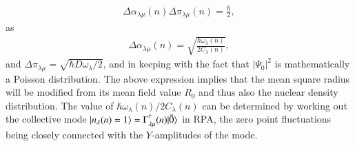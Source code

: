 \begin{align}\label{eq0.1.121}
\Delta\alpha_{\lambda\mu}{(n)}\Delta\pi_{\lambda\mu}{(n)}=\frac{\hbar}{2},
\end{align}
as
\begin{align}\label{eq1.8.2}
\Delta\alpha_{\lambda\mu}{(n)}=\sqrt{\frac{\hbar\omega_\lambda(n)}{2C_\lambda(n)}},
\end{align}
and $\Delta\pi_{\lambda\mu}=\sqrt{\hbar D\omega_\lambda/2}$, and in keeping with the fact that $|\Psi_0|^2$ is mathematically a Poisson distribution. The above expression implies that the mean square radius will be modified from its mean field value $R_0$  and thus also the nuclear density distribution. The value of $\hbar\omega_\lambda(n)/2C_\lambda(n)$ can be determined by working out the collective mode $|{n_\lambda(n)=1} \rangle=\Gamma_{\lambda\mu}^\dagger(n)|{\tilde 0} \rangle$ in RPA,  the zero point fluctuations being closely connected with the $Y$-amplitudes of the mode.

